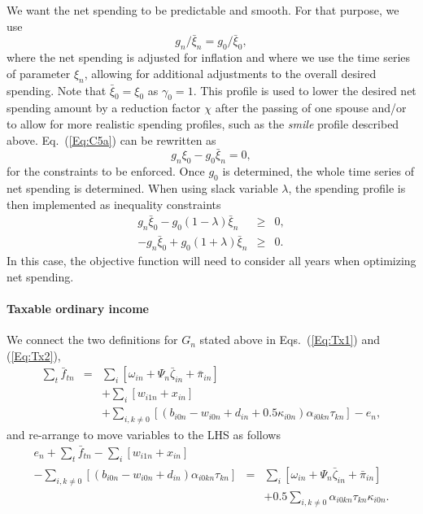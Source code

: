 \documentclass{report}[fleqn,12pt]
\begin{document}
	We want the net spending to be predictable and smooth. For that purpose, we use
\begin{equation}
	\label{Eq:C5a}
	g_{n}/\bar{\xi}_{n} = g_0/\bar{\xi}_0,
\end{equation}
where the net spending is adjusted for inflation and where we use the time series of parameter $\xi_n$,
allowing for additional adjustments to the overall desired spending.
Note that $\bar{\xi}_0 = \xi_0$ as $\gamma_0=1$.
This profile is used to lower the desired net spending amount by a reduction factor $\chi$
after the passing of one spouse and/or to allow for more realistic spending profiles, such as
the {\em smile} profile described above.
Eq.~(\ref{Eq:C5a}) can be rewritten as
\begin{equation}
	\label{Eq:C5}
	g_n \xi_0 - g_0 \bar{\xi}_n = 0,
\end{equation}
for the constraints to be enforced. Once $g_0$ is determined, the whole time series of net spending
is determined.
When using slack variable $\lambda$, the spending profile is then implemented as inequality constraints
\begin{eqnarray}
	\label{Eq:lambdha}
	g_n \bar{\xi}_0 - g_0 (1 - \lambda) \bar{\xi}_n &\geq&  0, \nonumber\\
	-g_n \bar{\xi}_0 + g_0 (1 + \lambda) \bar{\xi}_n &\geq&  0.
\end{eqnarray}
In this case, the objective function will need to consider all years when optimizing net spending.

\paragraph*{Taxable ordinary income}
	We connect the two definitions for $G_n$ stated above in Eqs.~(\ref{Eq:Tx1}) and (\ref{Eq:Tx2}),
	\begin{eqnarray}
		\sum_t \bar{f}_{tn} &=&
		\sum_i [\omega_{in} + \Psi_n\bar\zeta_{in} + \bar{\pi}_{in}]  \nonumber \\
		&& + \sum_i [w_{i1n} + x_{in} ]
		\nonumber\\
		&& + \sum_{i,k\neq 0} [(b_{i0n} - w_{i0n} + d_{in}
		     + 0.5\kappa_{i0n})\alpha_{i0kn}\tau_{kn}] - e_n,
	\end{eqnarray}
	and re-arrange to move variables to the LHS as follows
	\begin{eqnarray}
		\label{Eq:C6}
		e_n + \sum_t \bar{f}_{tn}
		- \sum_i [ w_{i1n} + x_{in}] &&
		\nonumber \\
		- \sum_{i,k\neq 0} [(b_{i0n} - w_{i0n} + d_{in})\alpha_{i0kn}\tau_{kn}] &=&
		\sum_i [\omega_{in} + \Psi_n\bar\zeta_{in} + \bar{\pi}_{in} ]
		\nonumber \\
		&& + 0.5\sum_{i,k\neq 0} \alpha_{i0kn}\tau_{kn}\kappa_{i0n}.
	\end{eqnarray}
\end{document}
